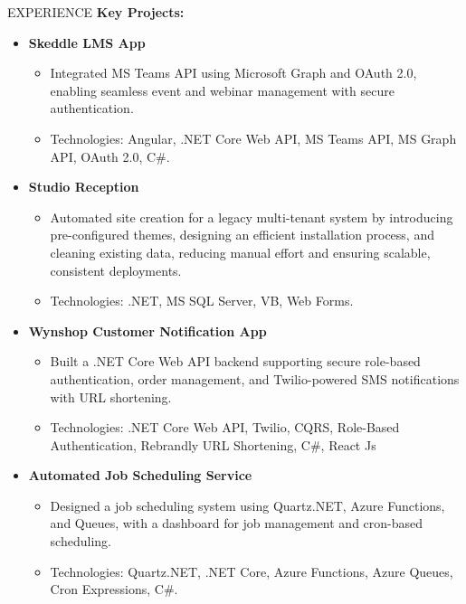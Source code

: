 \documentclass{resume} %
\begin{document}
\begin{rSection}{EXPERIENCE}
		\textbf{Key Projects:}
		\begin{itemize}
			\itemsep -5pt {} 
			\item \textbf {Skeddle LMS App} 
			\begin{itemize}
				\itemsep -5pt {}
				\item Integrated MS Teams API using Microsoft Graph and OAuth 2.0, enabling seamless event and webinar management with secure authentication.
				\item Technologies: Angular, .NET Core Web API, MS Teams API, MS Graph API, OAuth 2.0, C\#.
			\end{itemize}
				\item \textbf {Studio Reception} 
			\begin{itemize}
				\itemsep -5pt {} 
				\item Automated site creation for a legacy multi-tenant system by introducing pre-configured themes, 
				designing an efficient installation process, and cleaning existing data, reducing manual effort and ensuring scalable, consistent deployments. 
				\item Technologies: .NET, MS SQL Server, VB, Web Forms.
			\end{itemize}
			\item \textbf {Wynshop Customer Notification App} 
			\begin{itemize}
				\itemsep -5pt {} 
				\item Built a .NET Core Web API backend supporting secure role-based authentication, order management, and Twilio-powered SMS notifications with URL shortening.
				\item Technologies: .NET Core Web API, Twilio, CQRS, Role-Based Authentication, Rebrandly URL Shortening, C\#, React Js
			\end{itemize}
			\item \textbf {Automated Job Scheduling Service} 
			\begin{itemize}
				\itemsep -5pt {} 
				\item Designed a job scheduling system using Quartz.NET, Azure Functions, and Queues, with a dashboard for job management and cron-based scheduling.			
				\item Technologies: Quartz.NET, .NET Core, Azure Functions, Azure Queues, Cron Expressions, C\#.  \\ \\ \\ \\
			\end{itemize}
		\end{itemize}
		

\end{rSection}
\end{document}
